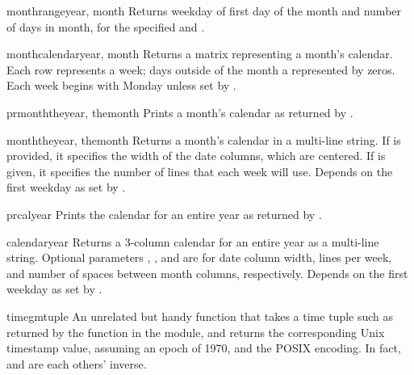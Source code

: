 \begin{funcdesc}{monthrange}{year, month}
Returns weekday of first day of the month and number of days in month, 
for the specified  and .
\end{funcdesc}

\begin{funcdesc}{monthcalendar}{year, month}
Returns a matrix representing a month's calendar.  Each row represents
a week; days outside of the month a represented by zeros.
Each week begins with Monday unless set by .
\end{funcdesc}

\begin{funcdesc}{prmonth}{theyear, themonth}
Prints a month's calendar as returned by .
\end{funcdesc}

\begin{funcdesc}{month}{theyear, themonth}
Returns a month's calendar in a multi-line string. If  is
provided, it specifies the width of the date columns, which are
centered. If  is given, it specifies the number of lines that
each week will use. Depends on the first weekday as set by
.
\end{funcdesc}

\begin{funcdesc}{prcal}{year}
Prints the calendar for an entire year as returned by 
.
\end{funcdesc}

\begin{funcdesc}{calendar}{year}
Returns a 3-column calendar for an entire year as a multi-line string.
Optional parameters , , and  are for date column
width, lines per week, and number of spaces between month columns,
respectively. Depends on the first weekday as set by
.
\end{funcdesc}

\begin{funcdesc}{timegm}{tuple}
An unrelated but handy function that takes a time tuple such as
returned by the  function in the 
module, and returns the corresponding Unix timestamp value, assuming
an epoch of 1970, and the POSIX encoding.  In fact,
 and  are each others' inverse.
\end{funcdesc}


\begin{seealso}
\end{seealso}
